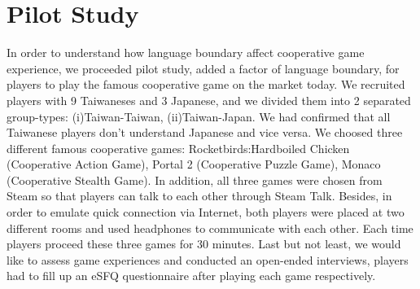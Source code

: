 \section{Pilot Study}


In order to understand how language boundary affect cooperative game experience, we proceeded pilot study, added a factor of language boundary, for players to play the famous cooperative game on the market today. We recruited players with 9 Taiwaneses and 3 Japanese, and we divided them into 2 separated group-types: (i)Taiwan-Taiwan, (ii)Taiwan-Japan. We had confirmed that all Taiwanese players don't understand Japanese and vice versa. We choosed three different famous cooperative games: Rocketbirds:Hardboiled Chicken (Cooperative Action Game), Portal 2 (Cooperative Puzzle Game), Monaco (Cooperative Stealth Game). In addition, all three games were chosen from Steam\cite{PS1} so that players can talk to each other through Steam Talk. Besides, in order to emulate quick connection via Internet, both players were placed at two different rooms and used headphones to communicate with each other. Each time players proceed these three games for 30 minutes. Last but not least, we would like to assess game experiences and conducted an open-ended interviews, players had to fill up an eSFQ\cite{eSFQ} questionnaire after playing each game respectively.

